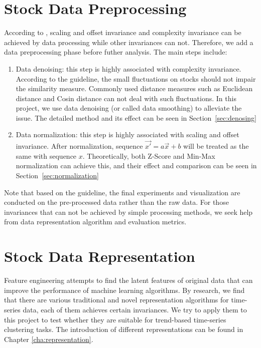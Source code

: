 \section{Stock Data Preprocessing}
\label{sec:Preprocessing}
According to \cite{paparrizos2015k}, scaling and offset invariance and complexity invariance can be achieved by data processing while other invariances can not. Therefore, we add a data preprocessing phase before futher analysis. The main steps include:
\begin{enumerate}
    \item Data denoising: this step is highly associated with complexity invariance. According to the guideline, the small fluctuations on stocks should not impair the similarity measure. Commonly used distance measures such as Euclidean distance and Cosin distance can not deal with such fluctuations. In this project, we use data denoising (or called data smoothing) to alleviate the issue. The detailed method and its effect can be seen in Section~\ref{sec:denosing}
    \item Data normalization: this step is highly associated with scaling and offset invariance. After normalization, sequence $\vec{x\prime} = a\vec{x} + b$ will be treated as the same with sequence $x$. Theoretically, both Z-Score and Min-Max normalization can achieve this, and their effect and comparison can be seen in Section~\ref{sec:normalization}
\end{enumerate}
Note that based on the guideline, the final experiments and visualization are conducted on the pre-processed data rather than the raw data. For those invariances that can not be achieved by simple processing methods, we seek help from data representation algorithm and evaluation metrics.

\section{Stock Data Representation}
\label{sec:Feature}
Feature engineering attempts to find the latent features of original data that can improve the performance of machine learning algorithms. By research, we find that there are various traditional and novel representation algorithms for time-series data, each of them achieves certain invariances. We try to apply them to this project to test whether they are suitable for trend-based time-series clustering tasks. The introduction of different representations can be found in Chapter \ref{cha:representation}.

